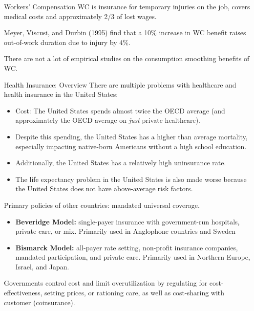 \documentclass[10pt]{extarticle}
\begin{document}
  \begin{problem}{Workers' Compensation}
    WC is insurance for temporary injuries on the job, covers medical costs and approximately 2/3 of lost wages.\newline

    Meyer, Viscusi, and Durbin (1995) find that a 10\% increase in WC benefit raises out-of-work duration due to injury by 4\%.\newline

    There are not a lot of empirical studies on the consumption smoothing benefits of WC.
  \end{problem}
  \begin{problem}{Health Insurance: Overview}
    There are multiple problems with healthcare and health insurance in the United States:
    \begin{itemize}
      \item Cost: The United States spends almost twice the OECD average (and approximately the OECD average on \textit{just} private healthcare).
      \item Despite this spending, the United States has a higher than average mortality, especially impacting native-born Americans without a high school education.
      \item Additionally, the United States has a relatively high uninsurance rate.
      \item The life expectancy problem in the United States is also made worse because the United States does not have above-average risk factors.
    \end{itemize}
    Primary policies of other countries: mandated universal coverage.
    \begin{itemize}
      \item \textbf{Beveridge Model:} single-payer insurance with government-run hospitals, private care, or mix. Primarily used in Anglophone countries and Sweden
      \item \textbf{Bismarck Model:} all-payer rate setting, non-profit insurance companies, mandated participation, and private care. Primarily used in Northern Europe, Israel, and Japan.
    \end{itemize}
    Governments control cost and limit overutilization by regulating for cost-effectiveness, setting prices, or rationing care, as well as cost-sharing with customer (coinsurance).\\


\end{problem}
\end{document}
